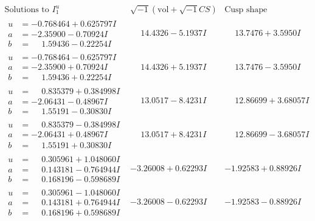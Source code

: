 \documentclass[1p]{elsarticle_modified}
\theoremstyle{definition}
\newcommand{\I}{\sqrt{-1}}
\begin{document}
$$\begin{array}{c|c|c}  
\text{Solutions to }I^u_{1}& \I (\text{vol} + \sqrt{-1}CS) & \text{Cusp shape}\\
 \hline 
\begin{aligned}
u &= -0.768464 + 0.625797 I \\
a &= -2.35900 - 0.70924 I \\
b &= \phantom{-}1.59436 - 0.22254 I\end{aligned}
 & \phantom{-}14.4326 - 5.1937 I & \phantom{-}13.7476 + 3.5950 I \\ \hline\begin{aligned}
u &= -0.768464 - 0.625797 I \\
a &= -2.35900 + 0.70924 I \\
b &= \phantom{-}1.59436 + 0.22254 I\end{aligned}
 & \phantom{-}14.4326 + 5.1937 I & \phantom{-}13.7476 - 3.5950 I \\ \hline\begin{aligned}
u &= \phantom{-}0.835379 + 0.384998 I \\
a &= -2.06431 - 0.48967 I \\
b &= \phantom{-}1.55191 - 0.30830 I\end{aligned}
 & \phantom{-}13.0517 - 8.4231 I & \phantom{-}12.86699 + 3.68057 I \\ \hline\begin{aligned}
u &= \phantom{-}0.835379 - 0.384998 I \\
a &= -2.06431 + 0.48967 I \\
b &= \phantom{-}1.55191 + 0.30830 I\end{aligned}
 & \phantom{-}13.0517 + 8.4231 I & \phantom{-}12.86699 - 3.68057 I \\ \hline\begin{aligned}
u &= \phantom{-}0.305961 + 1.048060 I \\
a &= \phantom{-}0.143181 - 0.764944 I \\
b &= \phantom{-}0.168196 - 0.598689 I\end{aligned}
 & -3.26008 + 0.62293 I & -1.92583 + 0.88926 I \\ \hline\begin{aligned}
u &= \phantom{-}0.305961 - 1.048060 I \\
a &= \phantom{-}0.143181 + 0.764944 I \\
b &= \phantom{-}0.168196 + 0.598689 I\end{aligned}
 & -3.26008 - 0.62293 I & -1.92583 - 0.88926 I \\ \hline\begin{aligned}

\end{aligned}
\end{array}$$
\end{document}
